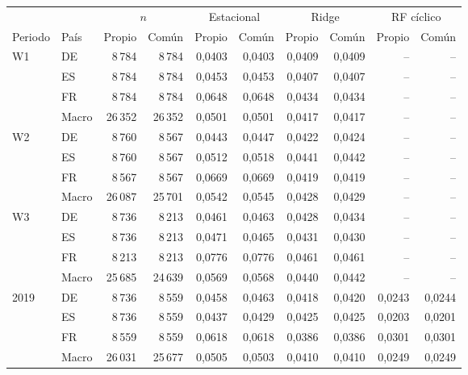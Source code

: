 \begin{tabular}{llrrrrrrrr}
\toprule
 & & \multicolumn{2}{c}{$n$} & \multicolumn{2}{c}{Estacional} & \multicolumn{2}{c}{Ridge} & \multicolumn{2}{c}{RF cíclico} \\
\cmidrule(lr){3-4}\cmidrule(lr){5-6}\cmidrule(lr){7-8}\cmidrule(lr){9-10}
Periodo & País & Propio & Común & Propio & Común & Propio & Común & Propio & Común \\
\midrule
W1 & DE & 8\,784 & 8\,784 & 0{,}0403 & 0{,}0403 & 0{,}0409 & 0{,}0409 & -- & -- \\
 & ES & 8\,784 & 8\,784 & 0{,}0453 & 0{,}0453 & 0{,}0407 & 0{,}0407 & -- & -- \\
 & FR & 8\,784 & 8\,784 & 0{,}0648 & 0{,}0648 & 0{,}0434 & 0{,}0434 & -- & -- \\
 & Macro & 26\,352 & 26\,352 & 0{,}0501 & 0{,}0501 & 0{,}0417 & 0{,}0417 & -- & -- \\
\midrule
W2 & DE & 8\,760 & 8\,567 & 0{,}0443 & 0{,}0447 & 0{,}0422 & 0{,}0424 & -- & -- \\
 & ES & 8\,760 & 8\,567 & 0{,}0512 & 0{,}0518 & 0{,}0441 & 0{,}0442 & -- & -- \\
 & FR & 8\,567 & 8\,567 & 0{,}0669 & 0{,}0669 & 0{,}0419 & 0{,}0419 & -- & -- \\
 & Macro & 26\,087 & 25\,701 & 0{,}0542 & 0{,}0545 & 0{,}0428 & 0{,}0429 & -- & -- \\
\midrule
W3 & DE & 8\,736 & 8\,213 & 0{,}0461 & 0{,}0463 & 0{,}0428 & 0{,}0434 & -- & -- \\
 & ES & 8\,736 & 8\,213 & 0{,}0471 & 0{,}0465 & 0{,}0431 & 0{,}0430 & -- & -- \\
 & FR & 8\,213 & 8\,213 & 0{,}0776 & 0{,}0776 & 0{,}0461 & 0{,}0461 & -- & -- \\
 & Macro & 25\,685 & 24\,639 & 0{,}0569 & 0{,}0568 & 0{,}0440 & 0{,}0442 & -- & -- \\
\midrule
2019 & DE & 8\,736 & 8\,559 & 0{,}0458 & 0{,}0463 & 0{,}0418 & 0{,}0420 & 0{,}0243 & 0{,}0244 \\
 & ES & 8\,736 & 8\,559 & 0{,}0437 & 0{,}0429 & 0{,}0425 & 0{,}0425 & 0{,}0203 & 0{,}0201 \\
 & FR & 8\,559 & 8\,559 & 0{,}0618 & 0{,}0618 & 0{,}0386 & 0{,}0386 & 0{,}0301 & 0{,}0301 \\
 & Macro & 26\,031 & 25\,677 & 0{,}0505 & 0{,}0503 & 0{,}0410 & 0{,}0410 & 0{,}0249 & 0{,}0249 \\
\bottomrule
\end{tabular}